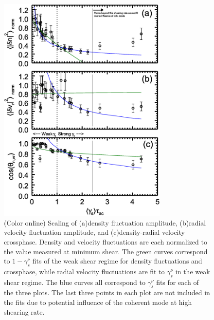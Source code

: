 \documentclass[aip,pop,amsmath,amssymb,preprint,superscriptaddress]{revtex4-1} %
\begin{document}
\begin{figure}[!htbp]
\centerline{
\includegraphics[width=8.5cm]{figure4.eps}}
\caption{\label{fig:densvrcp} (Color online) Scaling of (a)density fluctuation amplitude, (b)radial velocity fluctuation amplitude, and (c)density-radial velocity crossphase. Density and velocity fluctuations are each normalized to the value measured at minimum shear. The green curves correspond to $1-\gamma_{s}^{\nu}$ fits of the weak shear regime for density fluctuations and crossphase, while radial velocity fluctuations are fit to $\gamma_{s}^{\nu}$ in the weak shear regime. The blue curves all correspond to $\gamma_{s}^{\nu}$ fits for each of the three plots. The last three points in each plot are not included in the fits due to potential influence of the coherent mode at high shearing rate.}
\end{figure}
\end{document}
